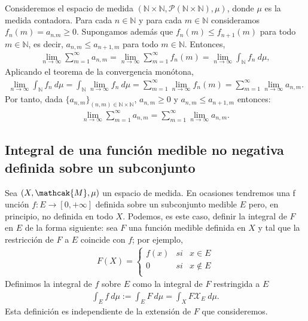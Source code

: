 \begin{ejemplo}
Consideremos el espacio de medida $(\mathbb{N} \times \mathbb{N}, \mathcal{P}(\mathbb{N} \times \mathbb{N}), \mu)$, donde $\mu$ es la medida contadora. Para cada $n\in \mathbb{N}$ y para cada $m\in \mathbb{N}$  consideramos $f_n(m) = a_{n.m} \ge 0$. Supongamos además que $f_n(m) \leq f_{n+1}(m)$ para todo $m \in \mathbb{N}$, es decir, $a_{n,m} \leq a_{n+1,m}$ para todo $m \in \mathbb{N}$. Entonces,
\begin{align*}
    \lim_{n \to \infty}{\sum_{m=1}^{\infty}{a_{n,m}}} = \lim_{n \to \infty}{\sum_{m=1}^{\infty}{f_n(m)}} = \lim_{n \to \infty}{\int_{\mathbb{N}}{{f_n \ d\mu}}},
\end{align*}
Aplicando el teorema de la convergencia monótona,
\begin{align*}
    \lim_{n \to \infty}{\int_{\mathbb{N}}{{f_n \ d\mu}}} = \int_{\mathbb{N}}{{\lim_{n \to \infty}{f_n \ d\mu}}} = \sum_{m=1}^{\infty}{\lim_{n \to \infty}{f_n(m)}} = \sum_{m=1}^{\infty}{\lim_{n \to \infty}{a_{n,m}}}.
\end{align*}
Por tanto, dada $\{a_{n,m}\}_{(n,m) \in \mathbb{N} \times \mathbb{N}}$, $a_{n,m} \ge 0$ y $a_{n,m} \leq a_{n+1,m}$ entonces:
\begin{align*}
    \lim_{n \to \infty}{\sum_{m=1}^{\infty}{a_{n,m}}} = \sum_{m=1}^{\infty}{\lim_{n \to \infty}{a_{n,m}}}.
\end{align*}
\end{ejemplo}

\subsection{Integral de una función medible no negativa definida sobre un subconjunto}
Sea $(X, \mathcak{M}, \mu)$ un espacio de medida. En ocasiones tendremos una f unción $f: E \longrightarrow [0,+\infty]$ definida sobre un subconjunto medible $E$ pero, en principio, no definida en todo $X$. Podemos, es este caso, definir la integral de $F$ en $E$ de la forma siguiente: sea $F$ una función medible definida en $X$ y tal que la restricción de $F$ a $E$ coincide con $f$; por ejemplo,
\begin{align*}
    F(X) = \left\{ \begin{array}{lcc}
             f(x) &  si  &x \in E\\
             0 &  si  &x \not \in E \\
             \end{array}
        \right.
\end{align*}
Definimos la integral de $f$ sobre $E$ como la integral de $F$ restringida a $E$
\begin{align*}
    \int_{E}{f \ d\mu} := \int_{E}{F \ d\mu} = \int_{X}{F \mathcal{X}_E \ d\mu}.
\end{align*}
Esta definición es independiente de la extensión de $F$ que consideremos.


